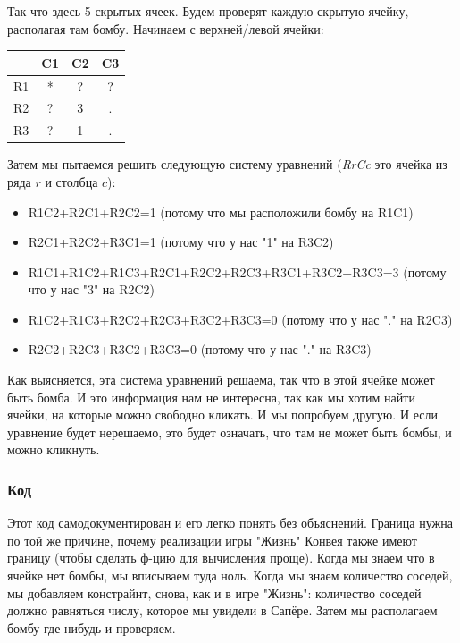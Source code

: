 Так что здесь 5 скрытых ячеек.
Будем проверят каждую скрытую ячейку, располагая там бомбу.
Начинаем с верхней/левой ячейки:

\begin{center}
\begin{tabular}{ | c | c | c | c | }
\hline
 & C1 & C2 & C3 \\
\hline
R1 & * & ? & ? \\
\hline
R2 & ? & 3 & . \\
\hline
R3 & ? & 1 & . \\
\hline
\end{tabular}
\end{center}

Затем мы пытаемся решить следующую систему уравнений (\textit{RrCc} это ячейка из ряда $r$ и столбца $c$):

\begin{itemize}
\item R1C2+R2C1+R2C2=1                               (потому что мы расположили бомбу на R1C1)	
\item R2C1+R2C2+R3C1=1                               (потому что у нас "1" на R3C2)	
\item R1C1+R1C2+R1C3+R2C1+R2C2+R2C3+R3C1+R3C2+R3C3=3 (потому что у нас "3" на R2C2)	
\item R1C2+R1C3+R2C2+R2C3+R3C2+R3C3=0                (потому что у нас "." на R2C3)	
\item R2C2+R2C3+R3C2+R3C3=0                          (потому что у нас "." на R3C3)
\end{itemize}

Как выясняется, эта система уравнений решаема, так что в этой ячейке может быть бомба.
И это информация нам не интересна, так как мы хотим найти ячейки, на которые можно свободно кликать.
И мы попробуем другую.
И если уравнение будет нерешаемо, это будет означать, что там не может быть бомбы, и можно кликнуть.

\subsubsection{Код}



Этот код самодокументирован и его легко понять без объяснений.
Граница нужна по той же причине, почему реализации игры "Жизнь" Конвея также имеют границу (чтобы сделать
ф-цию для вычисления проще).
Когда мы знаем что в ячейке нет бомбы, мы вписываем туда ноль.
Когда мы знаем количество соседей, мы добавляем констрайнт, снова, как и в игре "Жизнь": количество соседей
должно равняться числу, которое мы увидели в Сапёре.
Затем мы располагаем бомбу где-нибудь и проверяем.


